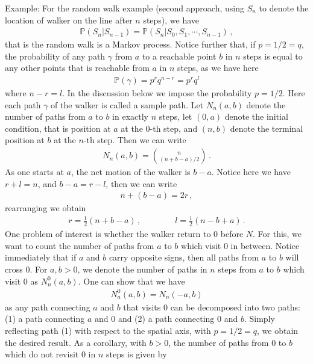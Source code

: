 \documentclass[11pt, onesided]{book}
\theoremstyle{break}
\theoremstyle{break}
\newcommand{\example}{\color{green}Example: \color{black}}
\begin{document}
\example For the random walk example (second approach, using $S_n$ to denote the location of walker on the line after $n$ steps), we have
\begin{align*}
\mathbb{P}(S_n | S_{n-1}) = \mathbb{P}(S_n | S_0,S_1,\cdots, S_{n-1})\,,
\end{align*} 
that is the random walk is a Markov process. Notice further that, if $p=1/2 =q$, the probability of any path $\gamma$ from $a$ to a reachable point $b$ in $n$ steps is equal to any other points that is reachable from $a$ in $n$ steps, as we have here
\begin{align*}
\mathbb{P}(\gamma) = p^r q^{n-r} = p^r q^l
\end{align*}
where $n-r = l$. In the discussion below we impose the probability $p = 1/2$. Here each path $\gamma$ of the walker is called a sample path. Let $N_n(a,b)$ denote the number of paths from $a$ to $b$ in exactly $n$ steps, let $(0,a)$ denote the initial condition, that is position at $a$ at the $0$-th step, and $(n,b)$ denote the terminal position at $b $ at the $n$-th step. Then we can write
\begin{align*}
N_n(a,b) = \binom{n}{(n+b-a)/2}\,.
\end{align*}
As one starts at $a$, the net motion of the walker is $b-a$. Notice here we have $r+l =n$, and $b-a = r-l$, then we can write
\begin{align*}
n+(b-a) = 2r\,,
\end{align*}
rearranging we obtain
\begin{align*}
r = \frac{1}{2}(n+b-a)\,,\qquad\qquad l =\frac{1}{2}(n-b+a)\,.
\end{align*}
One problem of interest is whether the walker return to $0$ before $N$. For this, we want to count the number of paths from $a$ to $b$ which visit $0$ in between. Notice immediately that if $a$ and $b$ carry opposite signs, then all paths from $a$ to $b$ will cross $0$. For $a,b>0$, we denote the number of paths in $n$ steps from $a$ to $b$ which visit $0$ as $N_n^0(a,b)$. One can show that we have
\begin{align*}
N_a^0(a,b) = N_n(-a,b)
\end{align*}
as any path connecting $a$ and $b$ that visits $0$ can be decomposed into two paths: (1) a path connecting $a$ and $0$ and (2) a path connecting $0$ and $b$. Simply reflecting path (1) with respect to the spatial axis, with $p = 1/2=q$, we obtain the desired result. As a corollary, with $b>0$, the number of paths from $0$ to $b$ which do not revisit $0$ in $n$ steps is given by
\end{document}
